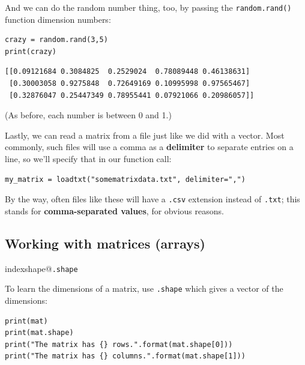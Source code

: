 And we can do the random number thing, too, by passing the
\texttt{random.rand()} function dimension numbers:

\begin{Verbatim}[fontsize=\small,samepage=true,frame=single,framesep=3mm]
crazy = random.rand(3,5)
print(crazy)
\end{Verbatim}
\vspace{-.2in}

\begin{Verbatim}[fontsize=\small,samepage=true,frame=leftline,framesep=5mm,framerule=1mm]
[[0.09121684 0.3084825  0.2529024  0.78089448 0.46138631]
 [0.30003058 0.9275848  0.72649169 0.10995998 0.97565467]
 [0.32876047 0.25447349 0.78955441 0.07921066 0.20986057]]
\end{Verbatim}

(As before, each number is between 0 and 1.)

\medskip
{}

Lastly, we can read a matrix from a file just like we did with a vector. Most
commonly, such files will use a comma as a \textbf{delimiter} to separate
entries on a line, so we'll specify that in our function call:

\begin{Verbatim}[fontsize=\small,samepage=true,frame=single,framesep=3mm]
my_matrix = loadtxt("somematrixdata.txt", delimiter=",")
\end{Verbatim}


By the way, often files like these will have a \texttt{.csv} extension instead
of \texttt{.txt}; this stands for \textbf{comma-separated values}, for obvious
reasons.


\subsection*{Working with matrices (arrays)}

index{shape@\texttt{.shape}}

To learn the dimensions of a matrix, use \texttt{.shape} which gives a vector
of the dimensions:

\begin{Verbatim}[fontsize=\small,samepage=true,frame=single,framesep=3mm]
print(mat)
print(mat.shape)
print("The matrix has {} rows.".format(mat.shape[0]))
print("The matrix has {} columns.".format(mat.shape[1]))
\end{Verbatim}
\vspace{-.2in}

